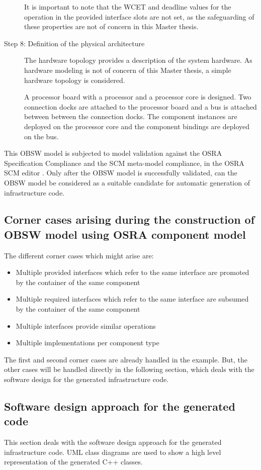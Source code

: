 \begin{description}
It is important to note that the WCET and deadline values for the operation in the provided interface slots are not set, as the safeguarding of these properties are not of concern in this Master thesis. 

\item [Step 8: Definition of the physical architecture] The hardware topology provides a description of the system hardware. As hardware modeling is not of concern of this Master thesis, a simple hardware topology is considered. 

A processor board with a processor and a processor core is designed. Two connection docks are attached to the processor board and a bus is attached between between the connection docks. The component instances are deployed on the processor core and the component bindings are deployed on the bus. 
\end{description}

This OBSW model is subjected to model validation against the OSRA Specification Compliance and the SCM meta-model compliance, in the OSRA SCM editor \cite{OSRAEditor}. Only after the OBSW model is successfully validated, can the OBSW model be considered as a suitable candidate for automatic generation of infrastructure code.  

\subsection{Corner cases arising during the construction of OBSW model using OSRA component model}
The different corner cases which might arise are:

\begin{itemize}
\item Multiple provided interfaces which refer to the same interface are promoted by the container of the same component
\item Multiple required interfaces which refer to the same interface are subsumed by the container of the same component
\item Multiple interfaces provide similar operations
\item Multiple implementations per component type
\end{itemize}

The first and second corner cases are already handled in the example. But, the other cases will be handled directly in the following section, which deals with the software design for the generated infrastructure code. 
   
\subsection{Software design approach for the generated code}
This section deals with the software design approach for the generated infrastructure code. UML class diagrams are used to show a high level representation of the generated C++ classes.  

